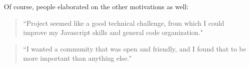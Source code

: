 Of course, people elaborated on the other motivations as well:

\begin{quotation}
``Project seemed like a good technical challenge, from which I could improve my Javascript 
skills and general code organization."
\end{quotation}

\begin{quotation}
``I wanted a community that was open and friendly, and I found that to be more 
important than anything else."
\end{quotation}

